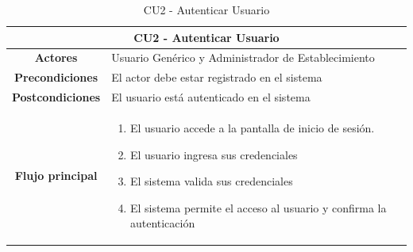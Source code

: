 \begin{table}[h]
    \centering
    \begin{tabular}{|c|p{10cm}|}
        \hline
        \multicolumn{2}{|c|}{\textbf{CU2 - Autenticar Usuario}}                                             \\
        \hline
        \textbf{Actores}         & Usuario Genérico y Administrador de Establecimiento                      \\
        \hline
        \textbf{Precondiciones}  & El actor debe estar registrado en el sistema                             \\
        \hline
        \textbf{Postcondiciones} & El usuario está autenticado en el sistema                                \\
        \hline
        \textbf{Flujo principal} & \begin{enumerate}
                                       \item El usuario accede a la pantalla de inicio de sesión.
                                       \item El usuario ingresa sus credenciales
                                       \item El sistema valida sus credenciales
                                       \item El sistema permite el acceso al usuario y confirma la autenticación
                                   \end{enumerate} \\
        \hline
    \end{tabular}
    \caption{CU2 - Autenticar Usuario }
\end{table}

